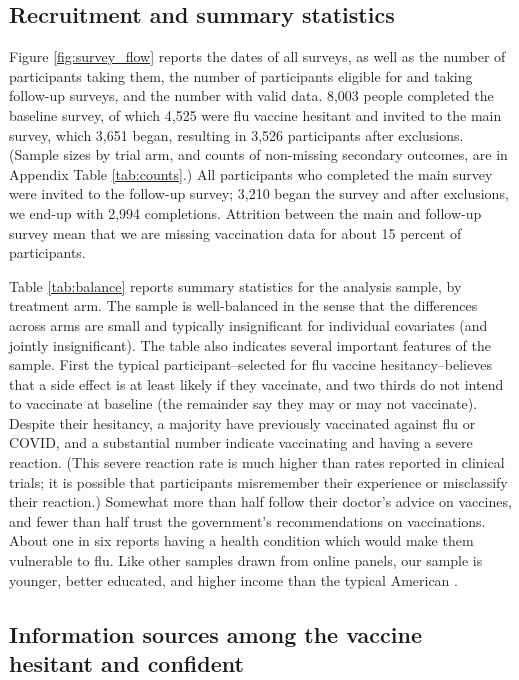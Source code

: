 \subsection{Recruitment and summary statistics}

Figure \ref{fig:survey_flow} reports the dates of all surveys, as well as the number of participants taking them, 
the number of participants eligible for and taking follow-up surveys, and the number with 
valid data. 8,003 people completed the baseline survey, of which 4,525 were flu vaccine 
hesitant and invited to the main survey, which 3,651 began, resulting in 3,526 participants
after exclusions. (Sample sizes by trial arm, and counts of non-missing secondary outcomes, 
are in Appendix Table \ref{tab:counts}.) All participants who completed the main survey were invited to 
the follow-up survey; 3,210 began the survey and after exclusions, 
we end-up with 2,994 completions. Attrition between the main and follow-up survey mean 
that we are missing vaccination data for about 15 percent of participants. 

Table \ref{tab:balance} reports summary statistics for the analysis sample, by treatment arm.  
The sample is well-balanced in the sense that the differences across arms are small and 
typically insignificant for individual covariates (and jointly insignificant). 
The table also indicates several important features of the sample. First the typical 
participant--selected for flu vaccine hesitancy--believes that a side effect is at least likely 
if they vaccinate, and two thirds do not intend to vaccinate at baseline (the remainder say 
they may or may not vaccinate). Despite their hesitancy, a majority have previously vaccinated 
against flu or COVID, and a substantial number indicate vaccinating and having a severe 
reaction. (This severe reaction rate is much higher than rates reported in clinical trials;
it is possible that participants misremember their experience or misclassify their reaction.)
Somewhat more than half follow their doctor’s advice on vaccines, and fewer than 
half trust the government’s recommendations on vaccinations.  About one in six reports having 
a health condition which would make them vulnerable to flu. Like other samples
drawn from online panels, our sample is younger, better educated, and higher income
than the typical American \citep{stantcheva2023run}.

\subsection{Information sources among the vaccine hesitant and confident}

